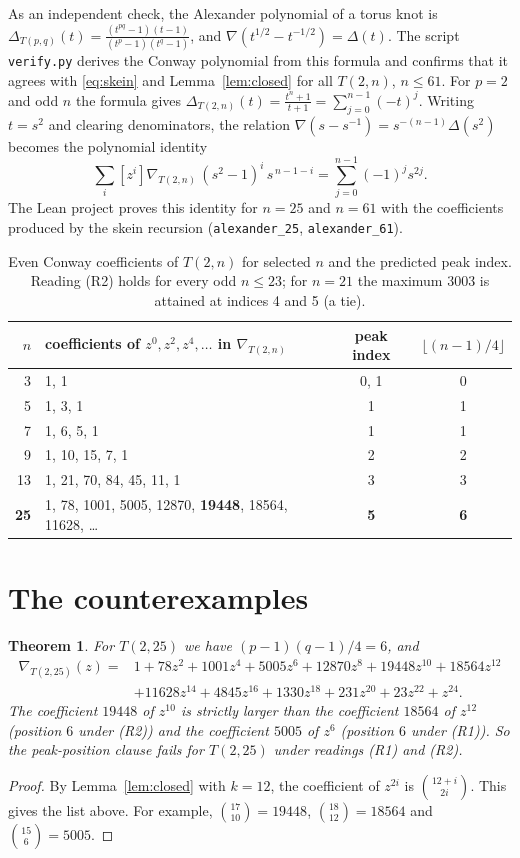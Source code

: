 \documentclass[11pt]{article}
\newtheorem{theorem}{Theorem}
\theoremstyle{definition}
\theoremstyle{remark}
\begin{document}
As an independent check, the Alexander polynomial of a torus knot is
$\Delta_{T(p,q)}(t)=\frac{(t^{pq}-1)(t-1)}{(t^p-1)(t^q-1)}$, and
$\nabla(t^{1/2}-t^{-1/2})=\Delta(t)$. The script \texttt{verify.py} derives the
Conway polynomial from this formula and confirms that it agrees with
\eqref{eq:skein} and Lemma~\ref{lem:closed} for all $T(2,n)$, $n\le 61$.
For $p=2$ and odd $n$ the formula gives
$\Delta_{T(2,n)}(t)=\frac{t^n+1}{t+1}=\sum_{j=0}^{n-1}(-t)^j$. Writing $t=s^2$ and
clearing denominators, the relation $\nabla(s-s^{-1})=s^{-(n-1)}\Delta(s^2)$
becomes the polynomial identity
\[
\sum_{i}[z^i]\nabla_{T(2,n)}\,(s^2-1)^i\,s^{\,n-1-i}=\sum_{j=0}^{n-1}(-1)^j s^{2j}.
\]
The Lean project proves this identity for $n=25$ and $n=61$ with the
coefficients produced by the skein recursion (\texttt{alexander\_25},
\texttt{alexander\_61}).

\begin{table}[ht]
\centering
\begin{tabular}{rlcc}
\toprule
$n$ & coefficients of $z^0,z^2,z^4,\dots$ in $\nabla_{T(2,n)}$ & peak index & $\lfloor (n-1)/4\rfloor$\\
\midrule
3 & 1, 1 & 0, 1 & 0\\
5 & 1, 3, 1 & 1 & 1\\
7 & 1, 6, 5, 1 & 1 & 1\\
9 & 1, 10, 15, 7, 1 & 2 & 2\\
13 & 1, 21, 70, 84, 45, 11, 1 & 3 & 3\\
\textbf{25} & 1, 78, 1001, 5005, 12870, \textbf{19448}, 18564, 11628, \dots & \textbf{5} & \textbf{6}\\
\bottomrule
\end{tabular}
\caption{Even Conway coefficients of $T(2,n)$ for selected $n$ and the
predicted peak index. Reading (R2) holds for every odd $n\le 23$; for $n=21$ the
maximum $3003$ is attained at indices 4 and 5 (a tie).}
\label{tab:small}
\end{table}

\section{The counterexamples}

\begin{theorem}\label{thm:25}
For $T(2,25)$ we have $(p-1)(q-1)/4 = 6$, and
\begin{align*}
\nabla_{T(2,25)}(z)={}&1+78z^2+1001z^4+5005z^6+12870z^8+19448z^{10}+18564z^{12}\\
&+11628z^{14}+4845z^{16}+1330z^{18}+231z^{20}+23z^{22}+z^{24}.
\end{align*}
The coefficient $19448$ of $z^{10}$ is strictly larger than the coefficient
$18564$ of $z^{12}$ (position $6$ under (R2)) and the coefficient $5005$ of $z^6$
(position $6$ under (R1)). So the peak-position clause fails for $T(2,25)$
under readings (R1) and (R2).
\end{theorem}
\begin{proof}
By Lemma~\ref{lem:closed} with $k=12$, the coefficient of $z^{2i}$ is
$\binom{12+i}{2i}$. This gives the list above. For example,
$\binom{17}{10}=19448$, $\binom{18}{12}=18564$ and $\binom{15}{6}=5005$.
\end{proof}
\end{document}
